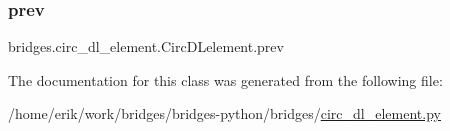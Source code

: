 \subsubsection{\texorpdfstring{prev}{prev}}
{\footnotesize\ttfamily bridges.\+circ\+\_\+dl\+\_\+element.\+Circ\+D\+Lelement.\+prev}



The documentation for this class was generated from the following file\+:\begin{DoxyCompactItemize}
\item 
/home/erik/work/bridges/bridges-\/python/bridges/\hyperlink{circ__dl__element_8py}{circ\+\_\+dl\+\_\+element.\+py}\end{DoxyCompactItemize}
